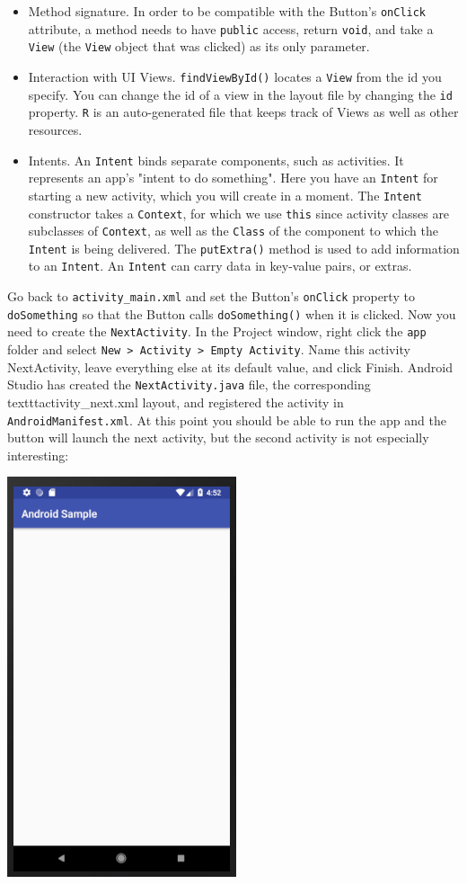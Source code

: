 \documentclass{article}
\begin{document}
\begin{itemize}
\item Method signature. In order to be compatible with the Button's \texttt{onClick} attribute, a method needs to have \texttt{public} access, return \texttt{void}, and take a \texttt{View} (the \texttt{View} object that was clicked) as its only parameter.
\item Interaction with UI Views. \texttt{findViewById()} locates a \texttt{View} from the id you specify. You can change the id of a view in the layout file by changing the \texttt{id} property. \texttt{R} is an auto-generated file that keeps track of Views as well as other resources.
\item Intents. An \texttt{Intent} binds separate components, such as activities. It represents an app's "intent to do something". Here you have an \texttt{Intent} for starting a new activity, which you will create in a moment. The \texttt{Intent} constructor takes a \texttt{Context}, for which we use \texttt{this} since activity classes are subclasses of \texttt{Context}, as well as the \texttt{Class} of the component to which the \texttt{Intent} is being delivered. The \texttt{putExtra()} method is used to add information to an \texttt{Intent}. An \texttt{Intent} can carry data in key-value pairs, or extras.
\end{itemize}
Go back to \texttt{activity\_main.xml} and set the Button's \texttt{onClick} property to \texttt{doSomething} so that the Button calls \texttt{doSomething()} when it is clicked. Now you need to create the \texttt{NextActivity}. In the Project window, right click the \texttt{app} folder and select \texttt{New > Activity > Empty Activity}. Name this activity NextActivity, leave everything else at its default value, and click Finish. Android Studio has created the \texttt{NextActivity.java} file, the corresponding texttt{activity\_next.xml} layout, and registered the activity in \texttt{AndroidManifest.xml}. At this point you should be able to run the app and the button will launch the next activity, but the second activity is not especially interesting:
\begin{center}\includegraphics[width=.4\textwidth]{images/wauw.png}\end{center}
\end{document}
